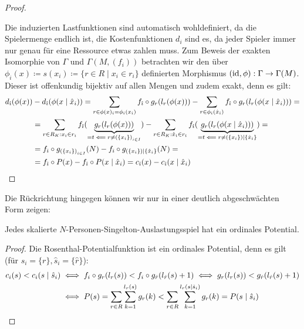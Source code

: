 \begin{proof}
\begin{itemize}
	\end{itemize}
	Die induzierten Lastfunktionen sind automatisch wohldefiniert, da die Spielermenge endlich ist, die Kostenfunktionen $d_i$ sind es, da jeder Spieler immer nur genau für eine Ressource etwas zahlen muss. Zum Beweis der exakten Isomorphie von $\Gamma$ und $\Gamma(M, (f_i))$ betrachten wir den über $\phi_i(x) \coloneqq s(x_i) \coloneqq \{r \in R \mid x_i \in r_i\}$ definierten Morphismus $(\mathrm{id}, \phi): \Gamma \to \Gamma(M)$. Dieser ist offenkundig bijektiv auf allen Mengen und zudem exakt, denn es gilt:
	\begin{align*}
	d_{\hat{\imath}}(\phi(x)) &- d_{\hat{\imath}}(\phi(x \mid \hat{x}_i)) =\sum_{r \in \phi(x)_{\hat{\imath}} = \phi_{\hat{\imath}}(x_{\hat{\imath}})} f_{\hat{\imath}} \circ g_r(l_r(\phi(x))) - \sum_{r \in \phi_{\hat{\imath}}(\hat{x}_{\hat{\imath}})} f_{\hat{\imath}} \circ g_r(l_r(\phi(x \mid \hat{x}_i))) = \\
	&=\sum_{r \in R_K: x_{\hat{\imath}} \in r_{\hat{\imath}}} f_{\hat{\imath}} (\underbrace{g_r(l_r(\phi(x)))}_{= t \impliedby r \neq \left(\{x_i\}\right)_{i \in I}}) -
	\sum_{r \in R_K: \hat{x}_{\hat{\imath}} \in r_{\hat{\imath}}} f_{\hat{\imath}} (\underbrace{g_r(l_r(\phi(x \mid \hat{x}_i)))}_{= t \impliedby r \neq \left(\{x_i\}\right)\mid\{\hat{x}_i\}}) = \\
	&=f_{\hat{\imath}} \circ g_{\left(\{x_i\}\right)_{i \in I}}(N) - f_{\hat{\imath}} \circ g_{\left(\{x_i\}\right)\mid\{\hat{x}_i\}}(N) = \\
	&=f_{\hat{\imath}} \circ P(x) - f_{\hat{\imath}} \circ P(x \mid \hat{x}_i) = c_{\hat{\imath}}(x) - c_{\hat{\imath}}(x \mid \hat{x}_i)	\qedhere							
	\end{align*}
\end{proof}

Die Rückrichtung hingegen können wir nur in einer deutlich abgeschwächten Form zeigen:

\begin{satz}\label{satz:skalSingeltonAusl}
	Jedes skalierte $N$-Personen-Singelton-Auslastungsspiel hat ein ordinales Potential.
\end{satz}

\begin{proof}
	Die Rosenthal-Potentialfunktion ist ein ordinales Potential, denn es gilt (für $s_i = \{r\}, \hat{s}_i = \{\hat{r}\}$):
	\begin{align*}
	c_i(s) < c_i(s \mid \hat{s}_i) &\iff f_i\circ g_r(l_r(s)) < f_i\circ g_{\hat{r}}(l_{\hat{r}}(s)+1) \iff g_r(l_r(s)) < g_{\hat{r}}(l_{\hat{r}}(s)+1) \\
	&\iff P(s) = \sum_{r \in R}\sum_{k=1}^{l_r(s)} g_r(k) < \sum_{r \in R}\sum_{k=1}^{l_r(s\mid \hat{s}_i)} g_r(k) = P(s\mid \hat{s}_i) \qedhere
	\end{align*}
\end{proof}

